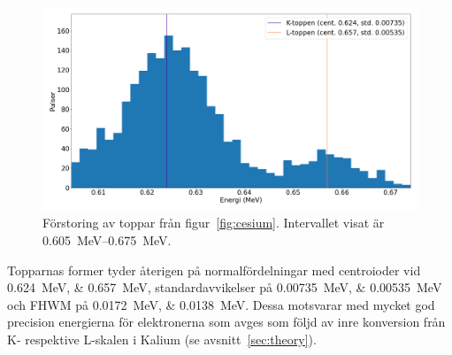 \begin{figure}[!ht]
    \centering
    \includegraphics[width=\textwidth, keepaspectratio]{../images/cesium_top.png}
    \caption{
        Förstoring av toppar från figur~\ref{fig:cesium}.
        Intervallet visat är \qtyrange{0.605}{0.675}{\MeV}.
    }
    \label{fig:cesiumtop}
\end{figure}

Topparnas former tyder återigen på normalfördelningar med centroioder vid
\qtylist{0.624;0.657}{\MeV}, standardavvikelser på
\qtylist{0.00735;0.00535}{\MeV} och FHWM på \qtylist{0.0172;0.0138}{\MeV}.
Dessa motsvarar med mycket god precision energierna för elektronerna som avges
som följd av inre konversion från K- respektive L-skalen i Kalium (se
avsnitt~\ref{sec:theory}).
